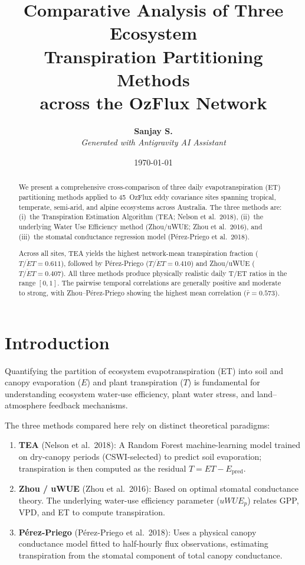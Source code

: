 \documentclass[11pt,a4paper]{article}
\title{\textbf{\Large Comparative Analysis of Three Ecosystem\\[4pt]
Transpiration Partitioning Methods\\[2pt]
across the OzFlux Network}}
\author{\textbf{Sanjay S.} \\[4pt]
\textit{Generated with Antigravity AI Assistant}}
\date{\today}
\begin{document}
\maketitle

\begin{abstract}
We present a comprehensive cross-comparison of three daily evapotranspiration (ET) partitioning
methods applied to 45~OzFlux eddy covariance sites spanning tropical, temperate, semi-arid,
and alpine ecosystems across Australia. The three methods are: (i)~the Transpiration Estimation
Algorithm (TEA; Nelson et al.\ 2018), (ii)~the underlying Water Use Efficiency method (Zhou/uWUE;
Zhou et al.\ 2016), and (iii)~the stomatal conductance regression model (P\'erez-Priego et al.\ 2018).

Across all sites, TEA yields the highest network-mean transpiration fraction
($\overline{T/ET} = 0.611$), followed by P\'erez-Priego
($\overline{T/ET} = 0.410$) and Zhou/uWUE
($\overline{T/ET} = 0.407$).
All three methods produce physically realistic daily T/ET ratios in the range $[0, 1]$.
The pairwise temporal correlations are generally positive and moderate to strong, with
Zhou--P\'erez-Priego showing the highest mean correlation
($\bar{r} = 0.573$).
\end{abstract}

\section{Introduction}
Quantifying the partition of ecosystem evapotranspiration (ET) into soil and canopy
evaporation ($E$) and plant transpiration ($T$) is fundamental for understanding ecosystem
water-use efficiency, plant water stress, and land--atmosphere feedback mechanisms.

The three methods compared here rely on distinct theoretical paradigms:
\begin{enumerate}
    \item \textbf{TEA} (Nelson et al.\ 2018): A Random Forest machine-learning model
    trained on dry-canopy periods (CSWI-selected) to predict soil evaporation; transpiration
    is then computed as the residual $T = ET - E_{\mathrm{pred}}$.
    \item \textbf{Zhou / uWUE} (Zhou et al.\ 2016): Based on optimal stomatal conductance
    theory. The underlying water-use efficiency parameter ($uWUE_p$) relates GPP, VPD,
    and ET to compute transpiration.
    \item \textbf{P\'erez-Priego} (P\'erez-Priego et al.\ 2018): Uses a physical canopy
    conductance model fitted to half-hourly flux observations, estimating transpiration from
    the stomatal component of total canopy conductance.
\end{enumerate}
\end{document}
